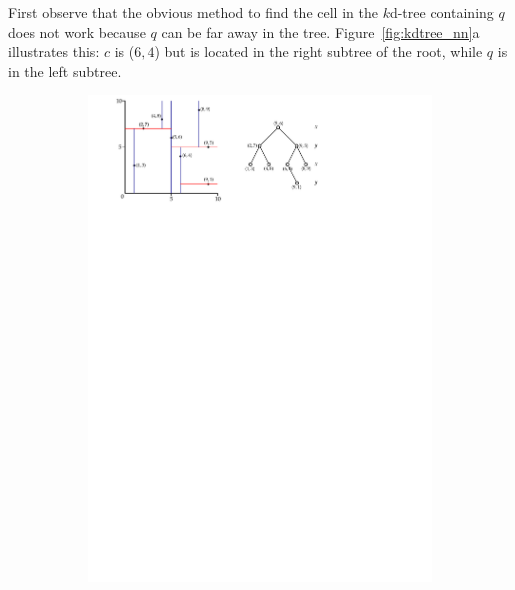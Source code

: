 First observe that the obvious method to find the cell in the $k$d-tree containing $q$ does not work because $q$ can be far away in the tree.
Figure~\ref{fig:kdtree_nn}a illustrates this: $c$ is ($6,4$) but is located in the right subtree of the root, while $q$ is in the left subtree.
\begin{figure}[tbp]
  \centering
  \begin{subfigure}[b]{0.6\linewidth}
    \centering
    \includegraphics[page=2,width=\textwidth]{figs/kdtree_nn.pdf}
    \caption{}
  \end{subfigure}
  \begin{subfigure}[b]{0.6\linewidth}
    \centering

\end{subfigure}
\end{figure}
